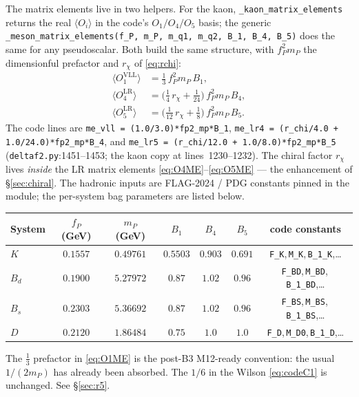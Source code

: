\documentclass[11pt]{article}
\newcommand{\code}[1]{\texttt{#1}}
\theoremstyle{definition}
\begin{document}
The matrix elements live in two helpers. For the kaon,
\code{\_kaon\_matrix\_elements} returns the real $\langle O_i\rangle$ in the
code's $O_1/O_4/O_5$ basis; the generic
\code{\_meson\_matrix\_elements(f\_P, m\_P, m\_q1, m\_q2, B\_1, B\_4, B\_5)} does
the same for any pseudoscalar. Both build the same structure, with
$f_P^2 m_P$ the dimensionful prefactor and $r_\chi$ of \eqref{eq:rchi}:
\begin{align}
\langle O_1^{\mathrm{VLL}}\rangle &= \tfrac{1}{3}\,f_P^2 m_P\, B_1,
\label{eq:O1ME}\\
\langle O_4^{\mathrm{LR}}\rangle &= \big(\tfrac14\,r_\chi + \tfrac{1}{24}\big)\,f_P^2 m_P\, B_4,
\label{eq:O4ME}\\
\langle O_5^{\mathrm{LR}}\rangle &= \big(\tfrac{1}{12}\,r_\chi + \tfrac18\big)\,f_P^2 m_P\, B_5.
\label{eq:O5ME}
\end{align}
The code lines are \code{me\_vll = (1.0/3.0)*fp2\_mp*B\_1},
\code{me\_lr4 = (r\_chi/4.0 + 1.0/24.0)*fp2\_mp*B\_4}, and
\code{me\_lr5 = (r\_chi/12.0 + 1.0/8.0)*fp2\_mp*B\_5}
(\code{deltaf2.py}:1451--1453; the kaon copy at lines~1230--1232). The chiral factor
$r_\chi$ lives \emph{inside} the LR matrix elements \eqref{eq:O4ME}--\eqref{eq:O5ME}
--- the enhancement of \S\ref{sec:chiral}. The hadronic inputs are FLAG-2024 / PDG
constants pinned in the module; the per-system bag parameters are listed below.
\begin{center}
\begin{tabular}{lcccccc}
\toprule
System & $f_P$ (GeV) & $m_P$ (GeV) & $B_1$ & $B_4$ & $B_5$ & code constants \\
\midrule
$K$   & $0.1557$ & $0.49761$ & $0.5503$ & $0.903$ & $0.691$ & \code{F\_K},\,\code{M\_K},\,\code{B\_1\_K},\dots \\
$B_d$ & $0.1900$ & $5.27972$ & $0.87$ & $1.02$ & $0.96$ & \code{F\_BD},\,\code{M\_BD},\,\code{B\_1\_BD},\dots \\
$B_s$ & $0.2303$ & $5.36692$ & $0.87$ & $1.02$ & $0.96$ & \code{F\_BS},\,\code{M\_BS},\,\code{B\_1\_BS},\dots \\
$D$   & $0.2120$ & $1.86484$ & $0.75$ & $1.0$ & $1.0$ & \code{F\_D},\,\code{M\_D0},\,\code{B\_1\_D},\dots \\
\bottomrule
\end{tabular}
\end{center}
The $\tfrac13$ prefactor in \eqref{eq:O1ME} is the post-B3 M12-ready convention:
the usual $1/(2m_P)$ has already been absorbed. The $1/6$ in the Wilson
\eqref{eq:codeC1} is unchanged. See \S\ref{sec:r5}.
\end{document}
